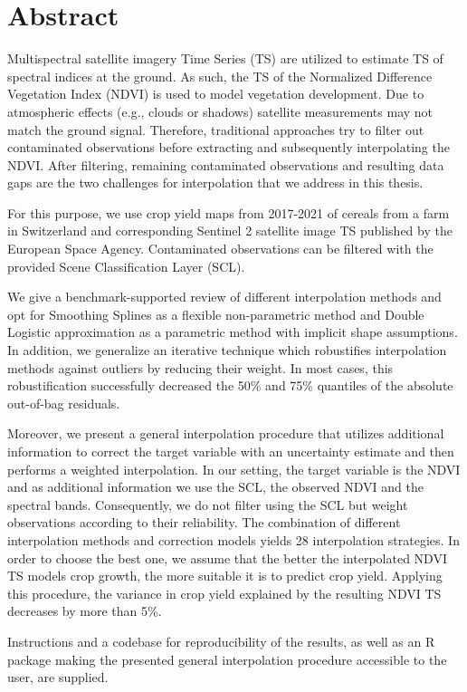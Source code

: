 \chapter*{Abstract}

Multispectral satellite imagery Time Series (TS) are utilized to estimate TS of spectral indices at the ground. As such, the TS of the Normalized Difference Vegetation Index (NDVI) is used to model vegetation development. 
Due to atmospheric effects (e.g., clouds or shadows) satellite measurements may not match the ground signal. Therefore, traditional approaches try to filter out contaminated observations before extracting and subsequently interpolating the NDVI. After filtering, remaining contaminated observations and resulting data gaps are the two challenges for interpolation that we address in this thesis.

For this purpose, we use crop yield maps from 2017-2021 of cereals from a farm in Switzerland and corresponding Sentinel 2 satellite image TS published by the European Space Agency. Contaminated observations can be filtered with the provided Scene Classification Layer (SCL). 

We give a benchmark-supported review of different interpolation methods and opt for Smoothing Splines as a flexible non-parametric method and Double Logistic approximation as a parametric method with implicit shape assumptions. In addition, we generalize an iterative technique which robustifies interpolation methods against outliers by reducing their weight. In most cases, this robustification successfully decreased the 50\% and 75\% quantiles of the absolute out-of-bag residuals. 

Moreover, we present a general interpolation procedure that utilizes additional information to correct the target variable with an uncertainty estimate and then performs a weighted interpolation. In our setting, the target variable is the NDVI and as additional information we use the SCL, the observed NDVI and the spectral bands. Consequently, we do not filter using the SCL but weight observations according to their reliability. The combination of different interpolation methods and correction models yields 28 interpolation strategies. In order to choose the best one, we assume that the better the interpolated NDVI TS models crop growth, the more suitable it is to predict crop yield. 
Applying this procedure, the variance in crop yield explained by the resulting NDVI TS decreases by more than 5\%. 

Instructions and a codebase for reproducibility of the results, as well as an R package making the presented general interpolation procedure accessible to the user, are supplied. 



